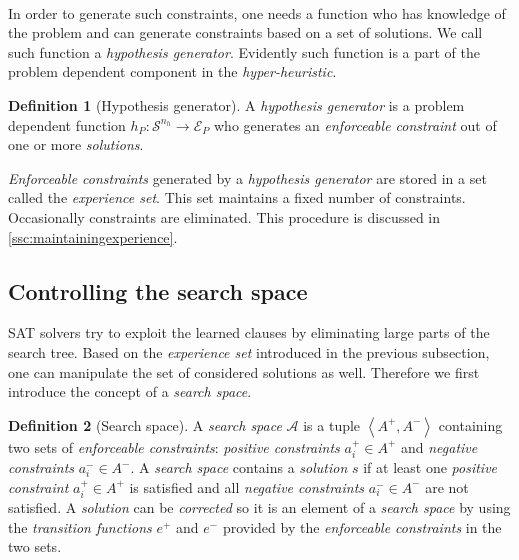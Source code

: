 \documentclass[a4paper,10pt]{article}
\newcommand{\seclab}[1]{\label{sec:#1}}
\newcommand{\sscref}[1]{\ref{ssc:#1}}
\newcommand{\tupl}[1]{\ensuremath{\left\langle #1 \right\rangle}}
\newcommand{\calS}{\ensuremath{\mathcal{S}}}
\newcommand{\calE}{\ensuremath{\mathcal{E}}}
\newcommand{\calA}{\ensuremath{\mathcal{A}}}
\theoremstyle{definition}
\newtheorem{definition}{Definition}
\begin{document}
\paragraph{}
In order to generate such constraints, one needs a function who has knowledge of the problem and can generate constraints based on a set of solutions. We call such function a \emph{hypothesis generator}. Evidently such function is a part of the problem dependent component in the \emph{hyper-heuristic}.
\begin{definition}[Hypothesis generator]
A \emph{hypothesis generator} is a problem dependent function $h_P:\calS^{n_h}\rightarrow\calE_P$ who generates an \emph{enforceable constraint} out of one or more \emph{solutions}.
\end{definition}
\emph{Enforceable constraints} generated by a \emph{hypothesis generator} are stored in a set called the \emph{experience set}. This set maintains a fixed number of constraints. Occasionally constraints are eliminated. This procedure is discussed in \sscref{maintainingexperience}.

\subsection{Controlling the search space}
\seclab{controllingsearchspace}
SAT solvers try to exploit the learned clauses by eliminating large parts of the search tree. Based on the \emph{experience set} introduced in the previous subsection, one can manipulate the set of considered solutions as well. Therefore we first introduce the concept of a \emph{search space}.
\begin{definition}[Search space]
A \emph{search space} $\calA$ is a tuple $\tupl{A^+,A^-}$ containing two sets of \emph{enforceable constraints}: \emph{positive constraints} $a^+_i\in A^+$ and \emph{negative constraints} $a^-_i\in A^-$. A \emph{search space} contains a \emph{solution} $s$ if at least one \emph{positive constraint} $a^+_i\in A^+$ is satisfied and all \emph{negative constraints} $a^-_i\in A^-$ are not satisfied. A \emph{solution} can be \emph{corrected} so it is an element of a \emph{search space} by using the \emph{transition functions} $e^+$ and $e^-$ provided by the \emph{enforceable constraints} in the two sets.%
\end{definition}
\end{document}
